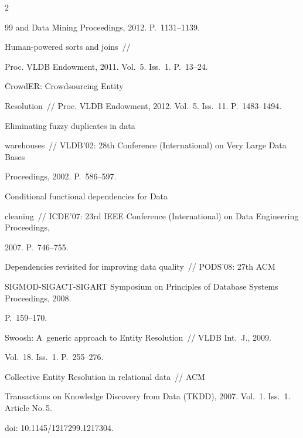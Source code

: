 \begin{multicols}{2}
{{\begin{thebibliography}{99}
and Data Mining Proceedings, 2012. P.~1131--1139.


 Human-powered sorts and joins~//

Proc. VLDB Endowment, 2011. Vol.~5. Iss.~1. P.~13--24.


 CrowdER: Crowdsourcing Entity

Resolution~// Proc. VLDB Endowment, 2012. Vol.~5. Iss.~11. P.~1483--1494.


 Eliminating fuzzy duplicates in data

warehouses~// VLDB'02:  28th Conference (International) on Very Large Data Bases

Proceedings, 2002. P.~586--597.


 Conditional functional dependencies for Data

cleaning~// ICDE'07: 23rd IEEE Conference (International) on Data Engineering Proceedings,

2007. P.~746--755.


 Dependencies revisited for improving data quality~// PODS'08:  27th ACM

SIGMOD-SIGACT-SIGART Symposium on Principles of Database Systems Proceedings, 2008.

P.~159--170.



Swoosh: A~generic approach to Entity Resolution~// VLDB Int.~J., 2009.

Vol.~18. Iss.~1. P.~255--276.


 Collective Entity Resolution in relational data~// ACM

Transactions on Knowledge Discovery from Data (TKDD), 2007. Vol.~1. Iss.~1. Article No.\,5.

doi: 10.1145/1217299.1217304.



\end{thebibliography}}}
\end{multicols}
